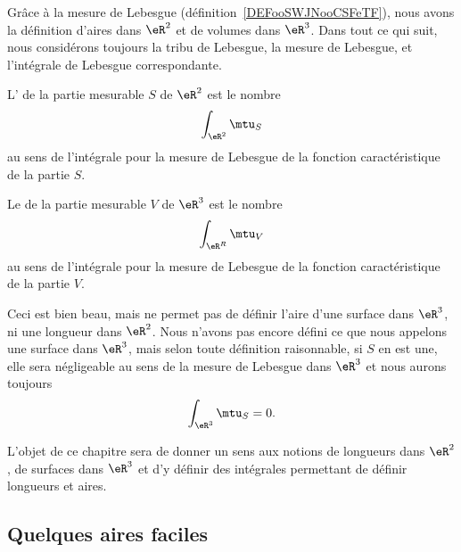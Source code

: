 Grâce à la mesure de Lebesgue (définition~\ref{DEFooSWJNooCSFeTF}), nous avons la définition d'aires dans \( \eR^2\) et de volumes dans \( \eR^3\). Dans tout ce qui suit, nous considérons toujours la tribu de Lebesgue, la mesure de Lebesgue, et l'intégrale de Lebesgue correspondante.

\begin{definition}      \label{DEFooPZRDooWbbBXy}
    L' de la partie mesurable \( S\) de \( \eR^2\) est le nombre
    \begin{equation}
        \int_{\eR^2}\mtu_S
    \end{equation}
    au sens de l'intégrale pour la mesure de Lebesgue de la fonction caractéristique de la partie \( S\).
\end{definition}

\begin{definition}
    Le  de la partie mesurable \( V\) de \( \eR^3\) est le nombre
    \begin{equation}
        \int_{\eR^R}\mtu_V
    \end{equation}
    au sens de l'intégrale pour la mesure de Lebesgue de la fonction caractéristique de la partie \( V\).
\end{definition}

Ceci est bien beau, mais ne permet pas de définir l'aire d'une surface dans \( \eR^3\), ni une longueur dans \( \eR^2\). Nous n'avons pas encore défini ce que nous appelons une surface dans \( \eR^3\), mais selon toute définition raisonnable, si \( S\) en est une, elle sera négligeable au sens de la mesure de Lebesgue dans \( \eR^3\) et nous aurons toujours
\begin{equation}
    \int_{\eR^3}\mtu_S=0.
\end{equation}

L'objet de ce chapitre sera de donner un sens aux notions de longueurs dans \( \eR^2\), de surfaces dans \( \eR^3\) et d'y définir des intégrales permettant de définir longueurs et aires.

\subsection{Quelques aires faciles}

